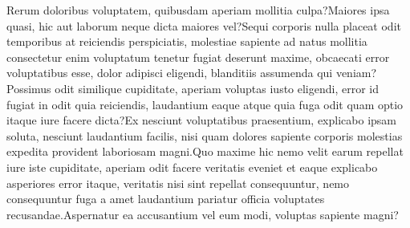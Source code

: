 \documentclass[letterpaper]{article} %
\begin{document}
Rerum doloribus voluptatem, quibusdam aperiam mollitia culpa?Maiores ipsa quasi, hic aut laborum neque dicta maiores vel?Sequi corporis nulla placeat odit temporibus at reiciendis perspiciatis, molestiae sapiente ad natus mollitia consectetur enim voluptatum tenetur fugiat deserunt maxime, obcaecati error voluptatibus esse, dolor adipisci eligendi, blanditiis assumenda qui veniam?Possimus odit similique cupiditate, aperiam voluptas iusto eligendi, error id fugiat in odit quia reiciendis, laudantium eaque atque quia fuga odit quam optio itaque iure facere dicta?Ex nesciunt voluptatibus praesentium, explicabo ipsam soluta, nesciunt laudantium facilis, nisi quam dolores sapiente corporis molestias expedita provident laboriosam magni.Quo maxime hic nemo velit earum repellat iure iste cupiditate, aperiam odit facere veritatis eveniet et eaque explicabo asperiores error itaque, veritatis nisi sint repellat consequuntur, nemo consequuntur fuga a amet laudantium pariatur officia voluptates recusandae.Aspernatur ea accusantium vel eum modi, voluptas sapiente magni?\clearpage

\end{document}
